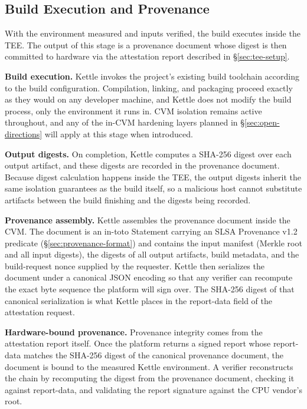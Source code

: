 \documentclass[11pt]{article}
\begin{document}
\subsection{Build Execution and Provenance}
\label{sec:build-execution}

With the environment measured and inputs verified, the build executes inside the TEE. The output of this stage is a provenance document whose digest is then committed to hardware via the attestation report described in \S\ref{sec:tee-setup}.

\textbf{Build execution.} Kettle invokes the project's existing build toolchain according to the build configuration. Compilation, linking, and packaging proceed exactly as they would on any developer machine, and Kettle does not modify the build process, only the environment it runs in. CVM isolation remains active throughout, and any of the in-CVM hardening layers planned in \S\ref{sec:open-directions} will apply at this stage when introduced.

\textbf{Output digests.} On completion, Kettle computes a SHA-256 digest over each output artifact, and these digests are recorded in the provenance document. Because digest calculation happens inside the TEE, the output digests inherit the same isolation guarantees as the build itself, so a malicious host cannot substitute artifacts between the build finishing and the digests being recorded.

\textbf{Provenance assembly.} Kettle assembles the provenance document inside the CVM. The document is an in-toto Statement carrying an SLSA Provenance v1.2 predicate (\S\ref{sec:provenance-format}) and contains the input manifest (Merkle root and all input digests), the digests of all output artifacts, build metadata, and the build-request nonce supplied by the requester. Kettle then serializes the document under a canonical JSON encoding so that any verifier can recompute the exact byte sequence the platform will sign over. The SHA-256 digest of that canonical serialization is what Kettle places in the report-data field of the attestation request.

\textbf{Hardware-bound provenance.} Provenance integrity comes from the attestation report itself. Once the platform returns a signed report whose report-data matches the SHA-256 digest of the canonical provenance document, the document is bound to the measured Kettle environment. A verifier reconstructs the chain by recomputing the digest from the provenance document, checking it against report-data, and validating the report signature against the CPU vendor's root.
\end{document}
